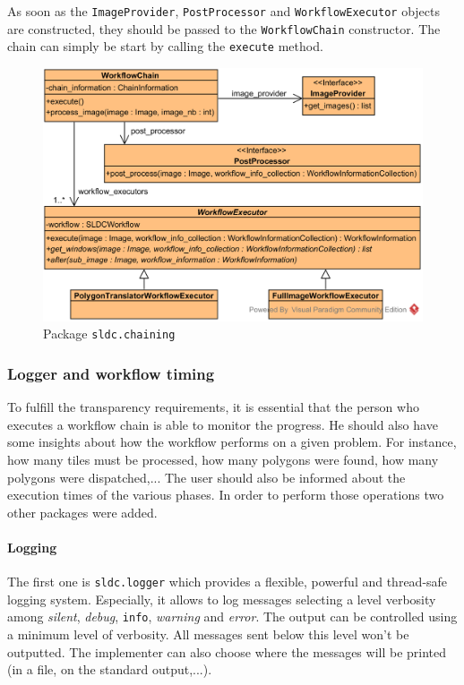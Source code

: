 As soon as the \texttt{ImageProvider}, \texttt{PostProcessor} and \texttt{WorkflowExecutor} objects are constructed, they should be passed to the \texttt{WorkflowChain} constructor. The chain can simply be start by calling the \texttt{execute} method.

\begin{figure}
	\center
	\includegraphics[scale=0.75]{image/uml_chaining.png}
	\caption{Package \texttt{sldc.chaining}}
	\label{fig:uml_chaining}
\end{figure}

\subsubsection{Logger and workflow timing}
To fulfill the transparency requirements, it is essential that the person who executes a workflow chain is able to monitor the progress. He should also have some insights about how the workflow performs on a given problem. For instance, how many tiles must be processed, how many polygons were found, how many polygons were dispatched,... The user should also be informed about the execution times of the various phases. In order to perform those operations two other packages were added. 

\paragraph{Logging} The first one is \texttt{sldc.logger} which provides a flexible, powerful and thread-safe logging system. Especially, it allows to log messages selecting a level verbosity among \textit{silent}, \textit{debug}, \texttt{info}, \textit{warning} and \textit{error}. The output can be controlled using a minimum level of verbosity. All messages sent below this level won't be outputted. The implementer can also choose where the messages will be printed (in a file, on the standard output,...).

